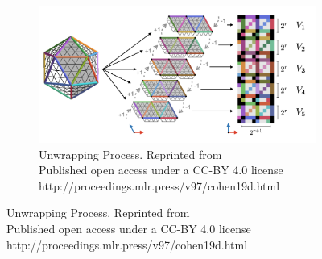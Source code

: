\begin{figure}[H]
\begin{subfigure}[t]{.35\linewidth}
  \end{subfigure}
  \par\bigskip
  \begin{subfigure}[t]{.55\linewidth}
    \includegraphics[width=0.90\linewidth]{chapter_3_polylidar3d/imgs/ico_unwrap.pdf}
    \caption{Unwrapping Process. Reprinted from ~\cite{cohen_gauge_2019} \\ Published open access under a CC-BY 4.0 license \\ http://proceedings.mlr.press/v97/cohen19d.html%
    \label{fig:ch3_process_unwrap}}\vspace{6pt}


\end{subfigure}
\end{figure}
